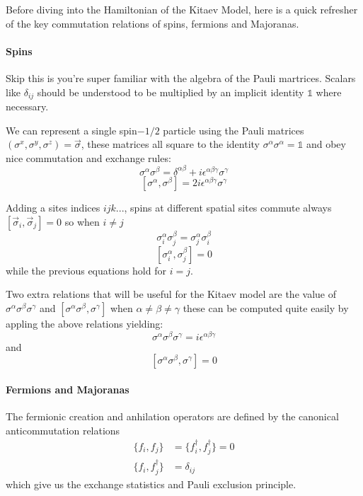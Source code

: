 Before diving into the Hamiltonian of the Kitaev Model, here is a quick
refresher of the key commutation relations of spins, fermions and
Majoranas.

\hypertarget{spins}{%
\paragraph{Spins}\label{spins}}

Skip this is you're super familiar with the algebra of the Pauli
martrices. Scalars like \(\delta_{ij}\) should be understood to be
multiplied by an implicit identity \(\mathbb{1}\) where necessary.

We can represent a single spin\(-1/2\) particle using the Pauli matrices
\((\sigma^x, \sigma^y, \sigma^z) = \vec{\sigma}\), these matrices all
square to the identity \(\sigma^\alpha \sigma^\alpha = \mathbb{1}\) and
obey nice commutation and exchange rules:
\[\sigma^\alpha \sigma^\beta = \delta^{\alpha \beta} + i \epsilon^{\alpha \beta \gamma} \sigma^\gamma\]
\[[\sigma^\alpha, \sigma^\beta] = 2 i \epsilon^{\alpha \beta \gamma} \sigma^\gamma\]

Adding a sites indices \(ijk...\), spins at different spatial sites
commute always \([\vec{\sigma}_i, \vec{\sigma}_j] = 0\) so when
\(i \neq j\)
\[\sigma_i^\alpha \sigma_j^\beta = \sigma_j^\alpha \sigma_i^\beta\]
\[[\sigma_i^\alpha, \sigma_j^\beta] = 0\] while the previous equations
hold for \(i = j\).

Two extra relations that will be useful for the Kitaev model are the
value of \(\sigma^\alpha \sigma^\beta \sigma^\gamma\) and
\([\sigma^\alpha \sigma^\beta, \sigma^\gamma]\) when
\(\alpha \neq \beta \neq \gamma\) these can be computed quite easily by
appling the above relations yielding:
\[\sigma^\alpha \sigma^\beta \sigma^\gamma = i \epsilon^{\alpha\beta\gamma}\]
and \[[\sigma^\alpha \sigma^\beta, \sigma^\gamma] = 0\]

\hypertarget{fermions-and-majoranas}{%
\paragraph{Fermions and Majoranas}\label{fermions-and-majoranas}}

The fermionic creation and anhilation operators are defined by the
canonical anticommutation relations \[\begin{aligned}
\{f_i, f_j\} &= \{f^\dagger_i, f^\dagger_j\} = 0\\
\{f_i, f^\dagger_j\} &= \delta_{ij}
\end{aligned}\] which give us the exchange statistics and Pauli
exclusion principle.

